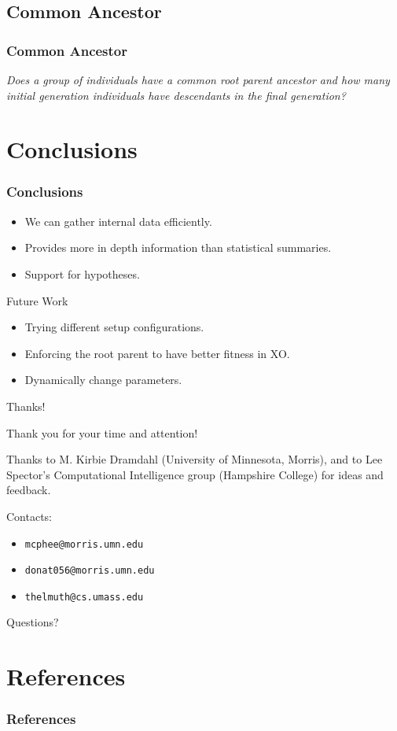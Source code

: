 \documentclass{beamer}
\newcommand{\linespace}{\vskip 0.25cm}
\begin{document}
\subsection[Common Ancestor]{Common Ancestor}

\begin{frame}
\frametitle{Common Ancestor}
\emph{Does a group of individuals have a common root parent ancestor and how many initial generation individuals have descendants in the final generation?}
\begin{center}
\end{center}

\end{frame}

\section[Conclusions]{Conclusions}

\begin{frame}
\frametitle{Conclusions}

\begin{itemize}
\item We can gather internal data efficiently.
\item Provides more in depth information than statistical summaries. 
\item Support for hypotheses.
\end{itemize}
\linespace
\linespace
\linespace
\linespace

Future Work
\begin{itemize}
\item Trying different setup configurations.
\item Enforcing the root parent to have better fitness in XO.
\item Dynamically change parameters.
\end{itemize}
\end{frame}

\begin{frame}{Thanks!}
	
	Thank you for your time and attention!

	\linespace
	
	Thanks to M. Kirbie Dramdahl (University of Minnesota, Morris), and to Lee Spector's Computational Intelligence group (Hampshire College) for ideas and feedback.
	
	\linespace
	
	Contacts:  
	\begin{itemize}
		\item \texttt{mcphee@morris.umn.edu}
		\item \texttt{donat056@morris.umn.edu}
		\item \texttt{thelmuth@cs.umass.edu}
	\end{itemize}
	
	\linespace
	\linespace
	
	\begin{center}
	{\huge Questions?}
	\end{center}
\end{frame}

\section*{References}

\begin{frame} 
\frametitle{References}

{\tiny }
\end{frame} 
\end{document}
